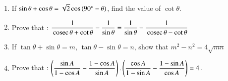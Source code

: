 \begin{enumerate}
\item If $\sin\theta+\cos\theta=\sqrt{2}\cos\left(90\degree{}-\theta\right)$, find the value of $\cot\theta$.
\item Prove that : $\dfrac{1}{\,\text{cosec}\,\theta+\cot\theta}-\dfrac{1}{\sin\theta}=\dfrac{1}{\sin\theta}-\dfrac{1}{\,\text{cosec}\,\theta-\cot\theta}$
\item If $\tan\theta+\sin\theta=m$, $\tan\theta-\sin\theta=n$, show that $m^{2}-n^{2}=4\sqrt{mn}$
\item Prove that : $\left(\dfrac{\sin A}{1-\cos A}-\dfrac{1-\cos A}{\sin A}\right).\left(\dfrac{\cos A}{1-\sin A}-\dfrac{1-\sin A}{\cos A}\right)=4$.
\end{enumerate}
